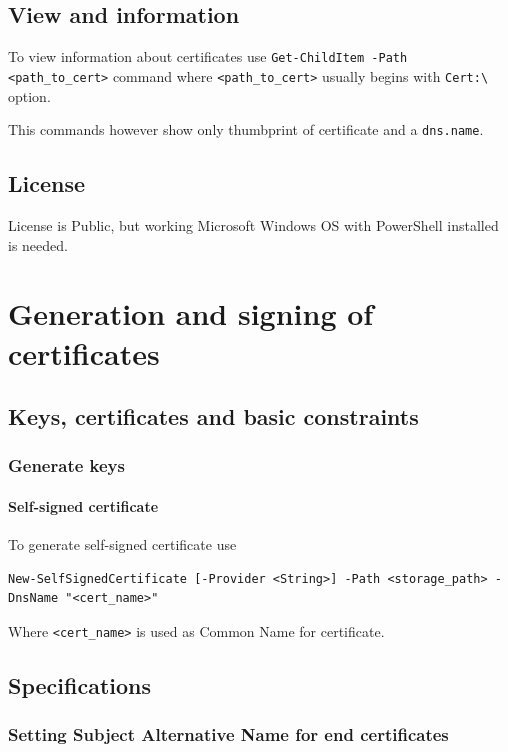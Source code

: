 \documentclass[10pt, a4paper]{report}
\begin{document}
  \subsection{View and information}
To view information about certificates use \verb+Get-ChildItem -Path <path_to_cert>+ command where \verb+<path_to_cert>+ usually begins with \verb+Cert:\+ option.

This commands however show only thumbprint of certificate and a \verb+dns.name+. 
  \subsection{License}
License is Public, but working Microsoft Windows OS with PowerShell installed is needed.
  
\section{Generation and signing of certificates}

  \subsection{Keys, certificates and basic constraints}
  
    \subsubsection{Generate keys}
    
      \paragraph{Self-signed certificate}
To generate self-signed certificate use 
\begin{verbatim}
New-SelfSignedCertificate [-Provider <String>] -Path <storage_path> -DnsName "<cert_name>" 
\end{verbatim}

Where \verb+<cert_name>+ is used as Common Name for certificate. 

  \subsection{Specifications}
  
    \subsubsection{Setting Subject Alternative Name for end certificates}
\end{document}
